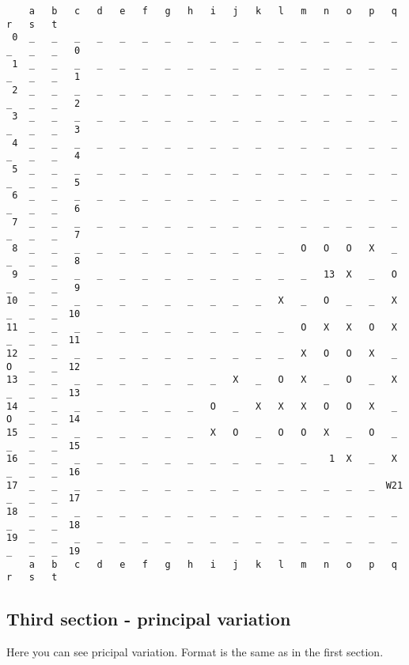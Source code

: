 \documentclass[12pt,a4paper]{article}
\begin{document}
\begin{scriptsize}
\begin{verbatim}
    a   b   c   d   e   f   g   h   i   j   k   l   m   n   o   p   q   r   s   t 
 0  _   _   _   _   _   _   _   _   _   _   _   _   _   _   _   _   _   _   _   _   0
 1  _   _   _   _   _   _   _   _   _   _   _   _   _   _   _   _   _   _   _   _   1
 2  _   _   _   _   _   _   _   _   _   _   _   _   _   _   _   _   _   _   _   _   2
 3  _   _   _   _   _   _   _   _   _   _   _   _   _   _   _   _   _   _   _   _   3
 4  _   _   _   _   _   _   _   _   _   _   _   _   _   _   _   _   _   _   _   _   4
 5  _   _   _   _   _   _   _   _   _   _   _   _   _   _   _   _   _   _   _   _   5
 6  _   _   _   _   _   _   _   _   _   _   _   _   _   _   _   _   _   _   _   _   6
 7  _   _   _   _   _   _   _   _   _   _   _   _   _   _   _   _   _   _   _   _   7
 8  _   _   _   _   _   _   _   _   _   _   _   _   O   O   O   X   _   _   _   _   8
 9  _   _   _   _   _   _   _   _   _   _   _   _   _   13  X   _   O   _   _   _   9
10  _   _   _   _   _   _   _   _   _   _   _   X   _   O   _   _   X   _   _   _  10
11  _   _   _   _   _   _   _   _   _   _   _   _   O   X   X   O   X   _   _   _  11
12  _   _   _   _   _   _   _   _   _   _   _   _   X   O   O   X   _   O   _   _  12
13  _   _   _   _   _   _   _   _   _   X   _   O   X   _   O   _   X   _   _   _  13
14  _   _   _   _   _   _   _   _   O   _   X   X   X   O   O   X   _   O   _   _  14
15  _   _   _   _   _   _   _   _   X   O   _   O   O   X   _   O   _   _   _   _  15
16  _   _   _   _   _   _   _   _   _   _   _   _   _    1  X   _   X   _   _   _  16
17  _   _   _   _   _   _   _   _   _   _   _   _   _   _   _   _  W21  _   _   _  17
18  _   _   _   _   _   _   _   _   _   _   _   _   _   _   _   _   _   _   _   _  18
19  _   _   _   _   _   _   _   _   _   _   _   _   _   _   _   _   _   _   _   _  19
    a   b   c   d   e   f   g   h   i   j   k   l   m   n   o   p   q   r   s   t 
\end{verbatim}
\end{scriptsize}

\subsection{Third section - principal variation}
Here you can see pricipal variation. Format is the same as in the first section.
\end{document}
